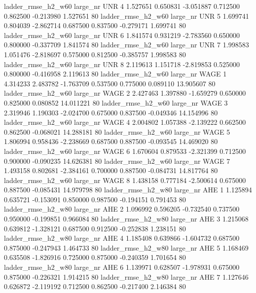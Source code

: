  ladder_rmse_h2_w60   large_nr      UNR                 4  1.527651  0.650831  -3.051887 0.712500 0.862500 -0.213980    1.527651 80
 ladder_rmse_h2_w60   large_nr      UNR                 5  1.699741  0.804039  -2.862714 0.687500 0.837500 -0.279171    1.699741 80
 ladder_rmse_h2_w60   large_nr      UNR                 6  1.841574  0.931219  -2.783560 0.650000 0.800000 -0.337709    1.841574 80
 ladder_rmse_h2_w60   large_nr      UNR                 7  1.998583  1.051476  -2.818697 0.575000 0.812500 -0.385757    1.998583 80
 ladder_rmse_h2_w60   large_nr      UNR                 8  2.119613  1.151718  -2.819853 0.525000 0.800000 -0.416958    2.119613 80
 ladder_rmse_h2_w60   large_nr     WAGE                 1  4.314233  2.483782  -1.763709 0.537500 0.775000  0.089110   13.905607 80
 ladder_rmse_h2_w60   large_nr     WAGE                 2  2.427463  1.397880  -1.659279 0.650000 0.825000  0.080852   14.011221 80
 ladder_rmse_h2_w60   large_nr     WAGE                 3  2.319946  1.190303  -2.024700 0.675000 0.837500 -0.049346   14.154996 80
 ladder_rmse_h2_w60   large_nr     WAGE                 4  2.004802  1.057388  -2.139222 0.662500 0.862500 -0.068021   14.288181 80
 ladder_rmse_h2_w60   large_nr     WAGE                 5  1.806994  0.958436  -2.238669 0.687500 0.887500 -0.093545   14.469020 80
 ladder_rmse_h2_w60   large_nr     WAGE                 6  1.670604  0.879533  -2.321399 0.712500 0.900000 -0.090235   14.626381 80
 ladder_rmse_h2_w60   large_nr     WAGE                 7  1.493158  0.802681  -2.384161 0.700000 0.887500 -0.084731   14.817764 80
 ladder_rmse_h2_w60   large_nr     WAGE                 8  1.438158  0.777184  -2.500614 0.675000 0.887500 -0.085431   14.979798 80
 ladder_rmse_h2_w80   large_nr      AHE                 1  1.125894  0.635721  -0.153091 0.850000 0.987500 -0.194151    0.791453 80
 ladder_rmse_h2_w80   large_nr      AHE                 2  1.096992  0.596205  -0.732540 0.737500 0.950000 -0.199851    0.966084 80
 ladder_rmse_h2_w80   large_nr      AHE                 3  1.215068  0.639812  -1.328121 0.687500 0.912500 -0.252838    1.238151 80
 ladder_rmse_h2_w80   large_nr      AHE                 4  1.185408  0.639866  -1.604732 0.687500 0.875000 -0.247943    1.464733 80
 ladder_rmse_h2_w80   large_nr      AHE                 5  1.168469  0.635508  -1.826916 0.725000 0.875000 -0.240359    1.701654 80
 ladder_rmse_h2_w80   large_nr      AHE                 6  1.139971  0.628507  -1.978931 0.675000 0.875000 -0.226321    1.914215 80
 ladder_rmse_h2_w80   large_nr      AHE                 7  1.127646  0.626872  -2.119192 0.712500 0.862500 -0.217400    2.146384 80
